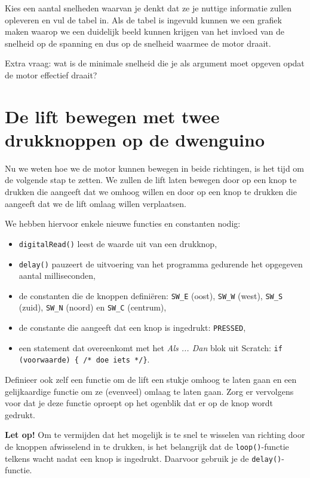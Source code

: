 \documentclass[a4paper, 10pt]{article}
\begin{document}
Kies een aantal snelheden waarvan je denkt dat ze je nuttige informatie zullen opleveren en vul de tabel in. Als de tabel
is ingevuld kunnen we een grafiek maken waarop we een duidelijk beeld kunnen krijgen van het invloed van de snelheid op
de spanning en dus op de snelheid waarmee de motor draait.

Extra vraag: wat is de minimale snelheid die je als argument moet opgeven opdat de motor effectief draait?


\section{De lift bewegen met twee drukknoppen op de dwenguino}

Nu we weten hoe we de motor kunnen bewegen in beide richtingen, is het tijd om de volgende stap te zetten. We zullen
de lift laten bewegen door op een knop te drukken die aangeeft dat we omhoog willen en door op een knop te drukken
die aangeeft dat we de lift omlaag willen verplaatsen.

We hebben hiervoor enkele nieuwe functies en constanten nodig:

\begin{itemize}
\item \texttt{digitalRead()} leest de waarde uit van een drukknop,
\item \texttt{delay()} pauzeert de uitvoering van het programma gedurende het opgegeven aantal milliseconden,
\item de constanten die de knoppen defini\"eren: \texttt{SW\_E} (oost), \texttt{SW\_W} (west), \texttt{SW\_S} (zuid), \texttt{SW\_N} (noord) en \texttt{SW\_C} (centrum),
\item de constante die aangeeft dat een knop is ingedrukt: \texttt{PRESSED},
\item een statement dat overeenkomt met het {\em Als ... Dan} blok uit Scratch: \texttt{if (voorwaarde) \{ /* doe iets */\}}.
\end{itemize}

Definieer ook zelf een functie om de lift een stukje omhoog te laten gaan en een gelijkaardige functie om ze (evenveel)
omlaag te laten gaan. Zorg er vervolgens voor dat je deze functie oproept op het ogenblik dat er op de knop wordt
gedrukt.

\textbf{Let op!} Om te vermijden dat het mogelijk is te snel te wisselen van richting door de knoppen afwisselend in te
drukken, is het belangrijk dat de \texttt{loop()}-functie telkens wacht nadat een knop is ingedrukt. Daarvoor gebruik je
de \texttt{delay()}-functie.
\end{document}
